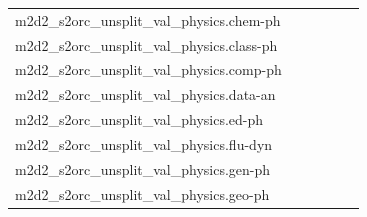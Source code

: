 \documentclass[dvipsnames]{article}
\begin{document}
\begin{appendix}
{\begin{longtable}{m{6cm}m{1.7cm}m{1.7cm}m{1.7cm}m{1.7cm}m{1.7cm}}
	m2d2\_s2orc\_unsplit\_val\_physics.chem-ph  & \colorbox[HTML]{ccea9c}{\makebox[\mywidth][c]{13.20}} & \colorbox[HTML]{ddf1a6}{\makebox[\mywidth][c]{13.29}} & \colorbox[HTML]{ffffe5}{\makebox[\mywidth][c]{15.22}} & \colorbox[HTML]{bde395}{\makebox[\mywidth][c]{13.14}} & \colorbox[HTML]{77c578}{\makebox[\mywidth][c]{12.97}}\\
	m2d2\_s2orc\_unsplit\_val\_physics.class-ph  & \colorbox[HTML]{9fd688}{\makebox[\mywidth][c]{11.01}} & \colorbox[HTML]{e7f5ad}{\makebox[\mywidth][c]{11.27}} & \colorbox[HTML]{ffffe5}{\makebox[\mywidth][c]{12.85}} & \colorbox[HTML]{c8e89a}{\makebox[\mywidth][c]{11.12}} & \colorbox[HTML]{77c578}{\makebox[\mywidth][c]{10.94}}\\
	m2d2\_s2orc\_unsplit\_val\_physics.comp-ph  & \colorbox[HTML]{bfe596}{\makebox[\mywidth][c]{11.23}} & \colorbox[HTML]{e3f4aa}{\makebox[\mywidth][c]{11.37}} & \colorbox[HTML]{ffffe5}{\makebox[\mywidth][c]{12.88}} & \colorbox[HTML]{c8e89a}{\makebox[\mywidth][c]{11.26}} & \colorbox[HTML]{77c578}{\makebox[\mywidth][c]{11.08}}\\
	m2d2\_s2orc\_unsplit\_val\_physics.data-an  & \colorbox[HTML]{c3e698}{\makebox[\mywidth][c]{13.18}} & \colorbox[HTML]{e5f4ab}{\makebox[\mywidth][c]{13.33}} & \colorbox[HTML]{ffffe5}{\makebox[\mywidth][c]{14.97}} & \colorbox[HTML]{d7efa2}{\makebox[\mywidth][c]{13.25}} & \colorbox[HTML]{77c578}{\makebox[\mywidth][c]{13.00}}\\
	m2d2\_s2orc\_unsplit\_val\_physics.ed-ph  & \colorbox[HTML]{c8e89a}{\makebox[\mywidth][c]{12.21}} & \colorbox[HTML]{e3f4aa}{\makebox[\mywidth][c]{12.33}} & \colorbox[HTML]{ffffe5}{\makebox[\mywidth][c]{13.88}} & \colorbox[HTML]{bee496}{\makebox[\mywidth][c]{12.18}} & \colorbox[HTML]{77c578}{\makebox[\mywidth][c]{12.03}}\\
	m2d2\_s2orc\_unsplit\_val\_physics.flu-dyn  & \colorbox[HTML]{bee496}{\makebox[\mywidth][c]{11.81}} & \colorbox[HTML]{e5f4ab}{\makebox[\mywidth][c]{11.99}} & \colorbox[HTML]{ffffe5}{\makebox[\mywidth][c]{13.73}} & \colorbox[HTML]{bee496}{\makebox[\mywidth][c]{11.81}} & \colorbox[HTML]{77c578}{\makebox[\mywidth][c]{11.64}}\\
	m2d2\_s2orc\_unsplit\_val\_physics.gen-ph  & \colorbox[HTML]{a4d98a}{\makebox[\mywidth][c]{14.15}} & \colorbox[HTML]{daf0a4}{\makebox[\mywidth][c]{14.39}} & \colorbox[HTML]{ffffe5}{\makebox[\mywidth][c]{16.76}} & \colorbox[HTML]{acdc8d}{\makebox[\mywidth][c]{14.18}} & \colorbox[HTML]{77c578}{\makebox[\mywidth][c]{14.03}}\\
	m2d2\_s2orc\_unsplit\_val\_physics.geo-ph  & \colorbox[HTML]{bde395}{\makebox[\mywidth][c]{14.75}} & \colorbox[HTML]{d8efa2}{\makebox[\mywidth][c]{14.86}} & \colorbox[HTML]{ffffe5}{\makebox[\mywidth][c]{16.81}} & \colorbox[HTML]{b3df91}{\makebox[\mywidth][c]{14.71}} & \colorbox[HTML]{77c578}{\makebox[\mywidth][c]{14.57}}\\

\end{longtable}}
\end{appendix}
\end{document}
